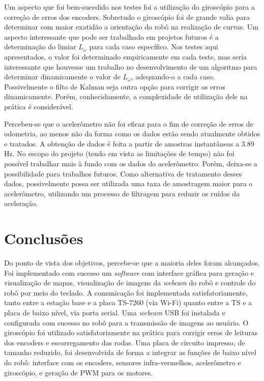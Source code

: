Um aspecto que foi bem-sucedido nos testes foi a utilização do giroscópio para a correção de erros dos encoders. Sobretudo o giroscópio foi de grande valia para determinar com maior exatidão a orientação do robô na realização de curvas. Um aspecto interessante que pode ser trabalhado em projetos futuros é a determinação do limiar $L_\omega$ para cada caso específico. Nos testes aqui apresentados, o valor foi determinado empiricamente em cada teste, mas seria interessante que houvesse um trabalho no desenvolvimento de um algoritmo para determinar dinamicamente o valor de $L_\omega$, adequando-o a cada caso. Possivelmente o filto de Kalman seja outra opção para corrigir os erros dinamicamente. Porém, conhecidamente, a complexidade de utilização dele na prática é considerável.

Percebeu-se que o acelerômetro não foi eficaz para o fim de correção de erros de odometria, ao menos não da forma como os dados estão sendo atualmente obtidos e tratados. A obtenção de dados é feita a partir de amostras instantâneas a 3.89 Hz. No escopo do projeto (tendo em vista as limitações de tempo) não foi possível trabalhar mais à fundo com os dados do acelerômetro. Porém, deixa-se a possibilidade para trabalhos futuros. Como alternativa de tratamento desses dados, possivelmente possa ser utilizada uma taxa de amostragem maior para o acelerômetro, utilizando um processo de filtragem para reduzir os ruídos da aceleração.

\chapter{Conclusões}

Do ponto de vista dos objetivos, percebe-se que a maioria deles foram alcançados. Foi implementado com sucesso um \textit{software} com interface gráfica para geração e visualização de mapas, visualização de imagens da \textit{webcam} do robô e controle do robô por meio do teclado. A comunicação foi implementada satisfatoriamente, tanto entre a estação base e a placa TS-7260 (via Wi-Fi) quanto entre a TS e a placa de baixo nível, via porta serial. Uma \textit{webcam} USB foi instalada e configurada com sucesso no robô para a transmissão de imagens ao usuário. O giroscópio foi utilizado satisfatoriamente na prática para corrigir erros de leituras dos encoders e escorregamento das rodas. Uma placa de circuito impresso, de tamanho reduzido, foi desenvolvida de forma a integrar as funções de baixo nível do robô: interface com os encoders, sensores infra-vermelhos, acelerômetro e giroscópio, e geração de PWM para os motores.

